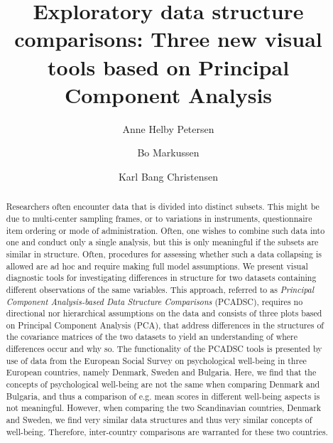 \documentclass[a4paper,14pt]{article}
\begin{document}

\title{Exploratory data structure comparisons: Three new visual tools based on Principal Component Analysis}

\author[1]{Anne Helby Petersen}
\author[1]{Bo Markussen}
\author[3]{Karl Bang Christensen}

\maketitle


\newpage

\begin{abstract}
Researchers often encounter data that is divided into distinct subsets. This might be due to multi-center sampling frames, or to variations in instruments, questionnaire item ordering or mode of administration. Often, one wishes to combine such data into one and conduct only a single analysis, but this is only meaningful if the subsets are similar in structure. Often, procedures for assessing whether such a data collapsing is allowed are ad hoc and require making full model assumptions. We present visual diagnostic tools for investigating differences in structure for two datasets containing different observations of the same variables. This approach, referred to as \textit{Principal Component Analysis-based Data Structure Comparisons} (PCADSC), requires no directional nor hierarchical assumptions on the data and consists of three plots based on Principal Component Analysis (PCA), that address differences in the structures of the covariance matrices of the two datasets to yield an  understanding of where differences occur and why so. The functionality of the PCADSC tools is presented by use of data from the European Social Survey on psychological well-being in three European countries, namely Denmark, Sweden and Bulgaria. Here, we find that the concepts of psychological well-being are not the same when comparing Denmark and Bulgaria, and thus a comparison of e.g. mean scores in different well-being aspects is not meaningful. However, when comparing the two Scandinavian countries, Denmark and Sweden, we find very similar data structures and thus very similar concepts of well-being. Therefore, inter-country comparisons are warranted for these two countries.
\end{abstract}
\end{document}
